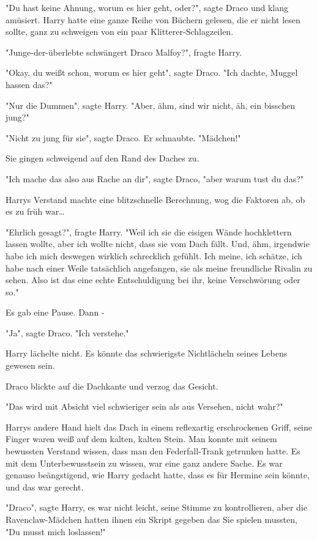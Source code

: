 {"Du hast keine Ahnung, worum es hier geht, oder?", sagte Draco und klang amüsiert. Harry hatte eine ganze Reihe von Büchern gelesen, die er nicht lesen sollte, ganz zu schweigen von ein paar Klitterer-Schlagzeilen.

"Junge-der-überlebte schwängert Draco Malfoy?", fragte Harry.

"Okay, du weißt schon, worum es hier geht", sagte Draco. "Ich dachte, Muggel hassen das?"

"Nur die Dummen", sagte Harry. "Aber, ähm, sind wir nicht, äh, ein bisschen jung?"

"Nicht zu jung für sie", sagte Draco. Er schnaubte. "Mädchen!"

Sie gingen schweigend auf den Rand des Daches zu.

"Ich mache das also aus Rache an dir", sagte Draco, "aber warum tust du das?"

Harrys Verstand machte eine blitzschnelle Berechnung, wog die Faktoren ab, ob es zu früh war…

"Ehrlich gesagt?", fragte Harry. "Weil ich sie die eisigen Wände hochklettern lassen wollte, aber ich wollte nicht, dass sie vom Dach fällt. Und, ähm, irgendwie habe ich mich deswegen wirklich schrecklich gefühlt. Ich meine, ich schätze, ich habe nach einer Weile tatsächlich angefangen, sie als meine freundliche Rivalin zu sehen. Also ist das eine echte Entschuldigung bei ihr, keine Verschwörung oder so."

Es gab eine Pause. Dann -

"Ja", sagte Draco. "Ich verstehe."

Harry lächelte nicht. Es könnte das schwierigste Nichtlächeln seines Lebens gewesen sein.

Draco blickte auf die Dachkante und verzog das Gesicht.

"Das wird mit Absicht viel schwieriger sein als aus Versehen, nicht wahr?"

Harrys andere Hand hielt das Dach in einem reflexartig erschrockenen Griff, seine Finger waren weiß auf dem kalten, kalten Stein. Man konnte mit seinem bewussten Verstand wissen, dass man den Federfall-Trank getrunken hatte. Es mit dem Unterbewusstsein zu wissen, war eine ganz andere Sache. Es war genauso beängstigend, wie Harry gedacht hatte, dass es für Hermine sein könnte, und das war gerecht.

"Draco", sagte Harry, es war nicht leicht, seine Stimme zu kontrollieren, aber die Ravenclaw-Mädchen hatten ihnen ein Skript gegeben das Sie spielen mussten, "Du musst mich loslassen!"

}
